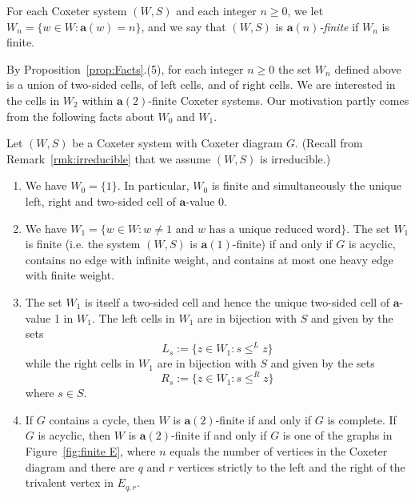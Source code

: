 \documentclass[ALCO,Unicode,published]{cedram}
\newcommand{\la}{\mathbf{a}}
\newcommand{\tul}{\textup{(}}
\newcommand{\tur}{\textup{)}}
\begin{document}
\begin{definition}
    For each Coxeter system $(W,S)$ and each integer $n\ge 0$, we let $W_n=\{w\in W:\la(w)=n\}$, and we say that
    $(W,S)$ is \emph{$\la(n)$-finite} if $W_n$ is finite. 
    \label{def:an-finite}
\end{definition}
 
By Proposition~\ref{prop:Facts}.(5), for each integer $n\ge 0$ the set $W_n$ defined above is a union of
two-sided cells, of left cells, and of right cells.  We are interested in the cells in $W_2$ within
$\la(2)$-finite Coxeter systems.  Our motivation partly comes from the following facts about $W_0$
and $W_1$. 

\begin{prop}
    \label{prop:facts01}
    Let $(W,S)$ be a Coxeter system with Coxeter diagram $G$. \tul Recall from Remark~\ref{rmk:irreducible} that
    we assume $(W,S)$ is irreducible.\tur
    \begin{enumerate}
        \item We have $W_0=\{1\}$. In particular, $W_0$ is finite and simultaneously
            the unique left, right and two-sided cell of $\la$-value 0. 
        \item We have  $W_1=\{w\in W:w\neq 1 \text{ and $w$ has a unique reduced word}\}$. The
            set $W_1$ is finite \textup{(}i.e. the
                system $(W,S)$
            is $\la(1)$-finite\textup{)} if and only if $G$ is acyclic, contains no edge with infinite
            weight, and contains at most one heavy edge with finite weight.  
        \item The set $W_1$ is itself a two-sided cell and hence the unique two-sided cell of $\la$-value 1 in
            $W_1$. The left cells in $W_1$ are in bijection with $S$ and given by the sets \[ L_{s}:=\{z\in
            W_1:s\le^L z\} \] while the right cells in $W_1$ are in bijection with $S$ and given by the sets \[
            R_{s}:=\{z\in W_1:s\le^R z\} \] where $s\in S$. 
        \item If $G$ contains a cycle, then $W$ is $\la(2)$-finite if and only if $G$ is complete. If~$G$ is
            acyclic, then $W$ is $\la(2)$-finite if and only if $G$ is one of the graphs in Figure~\ref{fig:finite
            E}, where $n$ equals the number of vertices in the Coxeter diagram and there are $q$ and $r$ vertices
            strictly to the left and the right of the trivalent vertex in $E_{q,r}$. 
            \begin{figure}
                \begin{tikzpicture}


\end{tikzpicture}
\end{figure}
\end{enumerate}
\end{prop}
\end{document}
